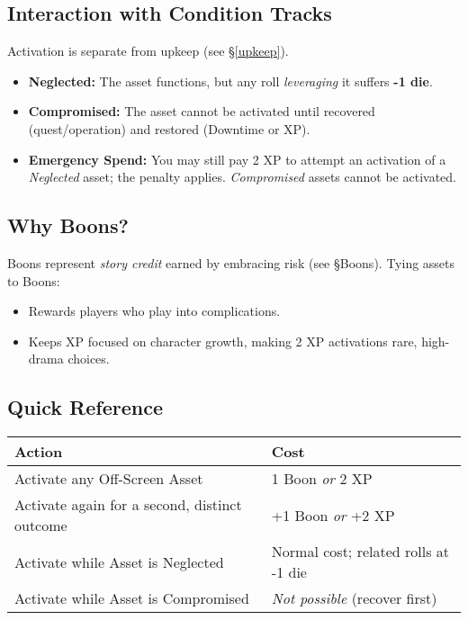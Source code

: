 \documentclass[12pt]{article}
\begin{document}
\subsection*{Interaction with Condition Tracks}
Activation is separate from upkeep (see \S\ref{upkeep}).
\begin{itemize}
  \item \textbf{Neglected:} The asset functions, but any roll \emph{leveraging} it suffers \textbf{-1 die}.
  \item \textbf{Compromised:} The asset cannot be activated until recovered (quest/operation) and restored (Downtime or XP).
  \item \textbf{Emergency Spend:} You may still pay 2 XP to attempt an activation of a \emph{Neglected} asset; the penalty applies. \emph{Compromised} assets cannot be activated.
\end{itemize}

\subsection*{Why Boons?}
Boons represent \emph{story credit} earned by embracing risk (see \S Boons). Tying assets to Boons:
\begin{itemize}
  \item Rewards players who play into complications.
  \item Keeps XP focused on character growth, making 2 XP activations rare, high-drama choices.
\end{itemize}

\subsection*{Quick Reference}
\begin{center}
\begin{tabular}{ll}
\toprule
\textbf{Action} & \textbf{Cost} \\
\midrule
Activate any Off-Screen Asset & 1 Boon \emph{or} 2 XP \\
Activate again for a second, distinct outcome & +1 Boon \emph{or} +2 XP \\
Activate while Asset is Neglected & Normal cost; related rolls at -1 die \\
Activate while Asset is Compromised & \textit{Not possible} (recover first) \\
\bottomrule
\end{tabular}
\end{center}
\end{document}
